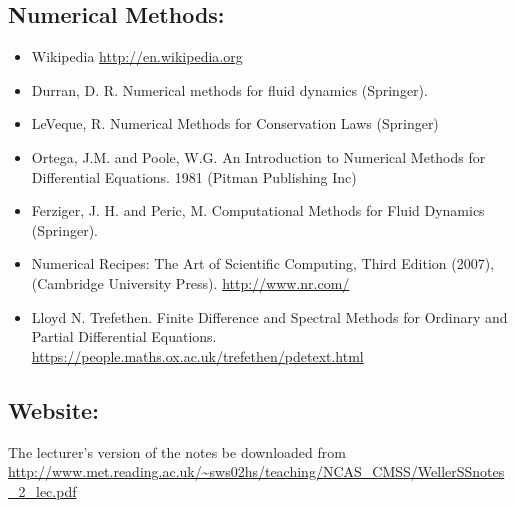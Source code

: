 \subsection*{Numerical Methods: }
\begin{itemize}
\item Wikipedia \url{http://en.wikipedia.org} 
\item Durran, D. R. Numerical methods for fluid dynamics (Springer). 
\item LeVeque, R. Numerical Methods for Conservation Laws (Springer)
\item Ortega, J.M. and Poole, W.G. An Introduction to Numerical Methods
for Differential Equations. 1981 (Pitman Publishing Inc)
\item Ferziger, J. H. and Peric, M. Computational Methods for Fluid Dynamics
(Springer). 
\item Numerical Recipes: The Art of Scientific Computing, Third Edition
(2007), (Cambridge University Press). \url{http://www.nr.com/} 
\item Lloyd N. Trefethen. Finite Difference and Spectral Methods for Ordinary
and Partial Differential Equations. \url{https://people.maths.ox.ac.uk/trefethen/pdetext.html}
\end{itemize}

\subsection*{Website:}

The lecturer's version of the notes be downloaded from\\
 \url{http://www.met.reading.ac.uk/~sws02hs/teaching/NCAS_CMSS/WellerSSnotes_2_lec.pdf}
